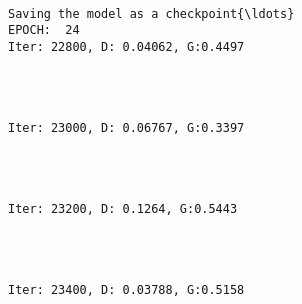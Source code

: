 \documentclass[11pt]{article}
\begin{document}
    \begin{Verbatim}[commandchars=\\\{\}]

Saving the model as a checkpoint{\ldots}
EPOCH:  24
Iter: 22800, D: 0.04062, G:0.4497
    \end{Verbatim}

    \begin{center}
    \end{center}
    { \hspace*{\fill} \\}
    
    \begin{Verbatim}[commandchars=\\\{\}]

Iter: 23000, D: 0.06767, G:0.3397
    \end{Verbatim}

    \begin{center}
    \end{center}
    { \hspace*{\fill} \\}
    
    \begin{Verbatim}[commandchars=\\\{\}]

Iter: 23200, D: 0.1264, G:0.5443
    \end{Verbatim}

    \begin{center}
    \end{center}
    { \hspace*{\fill} \\}
    
    \begin{Verbatim}[commandchars=\\\{\}]

Iter: 23400, D: 0.03788, G:0.5158
    \end{Verbatim}

    \begin{center}
    \end{center}
    { \hspace*{\fill} \\}
    
\end{document}
